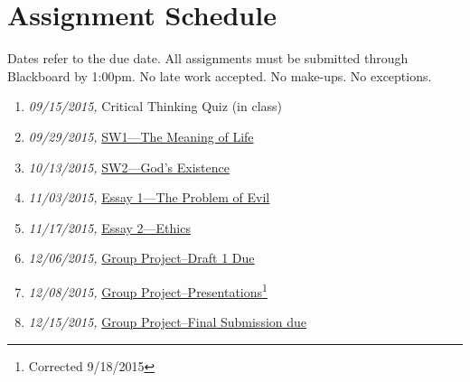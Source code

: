 \documentclass[article,oneside]{memoir}
\begin{document}
\section{Assignment Schedule}
Dates refer to the due date. All assignments must be submitted through Blackboard by 1:00pm. No late work accepted. No make-ups. No exceptions. 

\begin{enumerate}
\item \textit{09/15/2015,} Critical Thinking Quiz (in class)
\item \textit{09/29/2015,} \href{http://scoconno.github.io/Teaching/Examined/Meaning/SW1/}{SW1---The Meaning of Life} 
\item \textit{10/13/2015,} \href{http://scoconno.github.io/Teaching/Examined/God/SW2/}{SW2---God's Existence}
\item \textit{11/03/2015,} \href{http://scoconno.github.io/Teaching/Examined/God/Essay1}{Essay 1---The Problem of Evil}
\item \textit{11/17/2015,} \href{http://scoconno.github.io/Teaching/Examined/Ethics/Essay/}{Essay 2---Ethics}
\item \textit{12/06/2015,} \href{http://scoconno.github.io/Teaching/Examined/Applied/Group/}{Group Project--Draft 1 Due}
\item \textit{12/08/2015,} \href{http://scoconno.github.io/Teaching/Examined/Applied/Group/}{Group Project--Presentations}\footnote{Corrected 9/18/2015}
\item \textit{12/15/2015,} \href{http://scoconno.github.io/Teaching/Examined/Applied/Group/}{Group Project--Final Submission due}
\end{enumerate}




\end{document}

